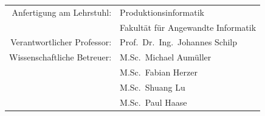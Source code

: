 \begin{titlepage}
\begin{tabular}{rl}
Anfertigung am Lehrstuhl:
                        & \quad Produktionsinformatik\\[1,5ex]
                        & \quad Fakultät für Angewandte Informatik\\[1,5ex]
Verantwortlicher Professor:
                        & \quad Prof.~Dr.~Ing.~Johannes Schilp\\[1,5ex]
Wissenschaftliche Betreuer:
                        & \quad M.Sc.~Michael Aumüller\\
                        & \quad M.Sc.~Fabian Herzer\\
						& \quad M.Sc.~Shuang Lu\\
						& \quad M.Sc.~Paul Haase\\[1,5ex]
\end{tabular}
\vfill
\end{titlepage}







